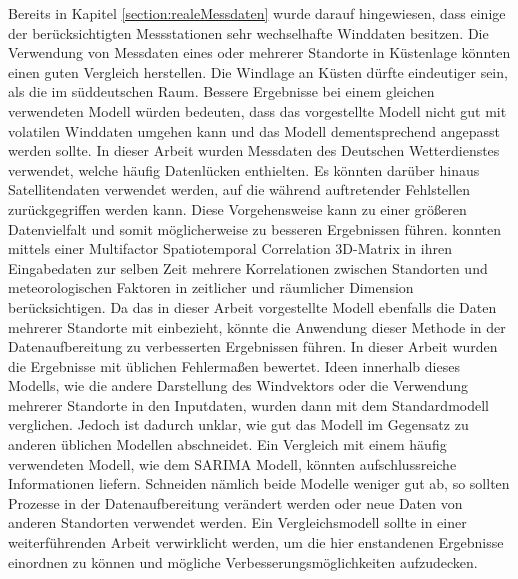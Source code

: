 \documentclass[
12pt, %
toc=listofnumbered, %
toc=chapterentrydotfill, %
numbers=noenddot, %
captions=tableheading, %
bibliography=numbered
]{scrreprt}
\begin{document}
Bereits in Kapitel \ref{section:realeMessdaten} wurde darauf hingewiesen, dass einige der berücksichtigten Messstationen sehr wechselhafte Winddaten besitzen. Die Verwendung von Messdaten eines oder mehrerer Standorte in Küstenlage könnten einen guten Vergleich herstellen. 
Die Windlage an Küsten dürfte eindeutiger sein, als die im süddeutschen Raum. Bessere Ergebnisse bei einem gleichen verwendeten Modell würden bedeuten, dass das vorgestellte Modell nicht gut mit volatilen Winddaten umgehen kann und das Modell dementsprechend angepasst werden sollte.
\newline
In dieser Arbeit wurden Messdaten des Deutschen Wetterdienstes verwendet, welche häufig Datenlücken enthielten. Es könnten darüber hinaus Satellitendaten verwendet werden, auf die während auftretender Fehlstellen zurückgegriffen werden kann. 
Diese Vorgehensweise kann zu einer größeren Datenvielfalt und somit möglicherweise zu besseren Ergebnissen führen.
\newline
\citeauthor{2019_Chen_MultifactorSpatiotemporalCorrelation} \cite{2019_Chen_MultifactorSpatiotemporalCorrelation} konnten mittels einer Multifactor Spatiotemporal Correlation 3D-Matrix in ihren Eingabedaten zur selben Zeit mehrere Korrelationen zwischen Standorten und meteorologischen Faktoren in zeitlicher und räumlicher Dimension berücksichtigen. 
Da das in dieser Arbeit vorgestellte Modell ebenfalls die Daten mehrerer Standorte mit einbezieht, könnte die Anwendung dieser Methode in der Datenaufbereitung zu verbesserten Ergebnissen führen. 
\newline
In dieser Arbeit wurden die Ergebnisse mit üblichen Fehlermaßen bewertet. Ideen innerhalb dieses Modells, wie die andere Darstellung des Windvektors oder die Verwendung mehrerer Standorte in den Inputdaten, wurden dann mit dem Standardmodell verglichen. 
Jedoch ist dadurch unklar, wie gut das Modell im Gegensatz zu anderen üblichen Modellen abschneidet. Ein Vergleich mit einem häufig verwendeten Modell, wie dem SARIMA Modell, könnten aufschlussreiche Informationen liefern. 
Schneiden nämlich beide Modelle weniger gut ab, so sollten Prozesse in der Datenaufbereitung verändert werden oder neue Daten von anderen Standorten verwendet werden. Ein Vergleichsmodell sollte in einer weiterführenden Arbeit verwirklicht werden, um die hier enstandenen Ergebnisse einordnen zu können und mögliche Verbesserungsmöglichkeiten aufzudecken.
\end{document}

